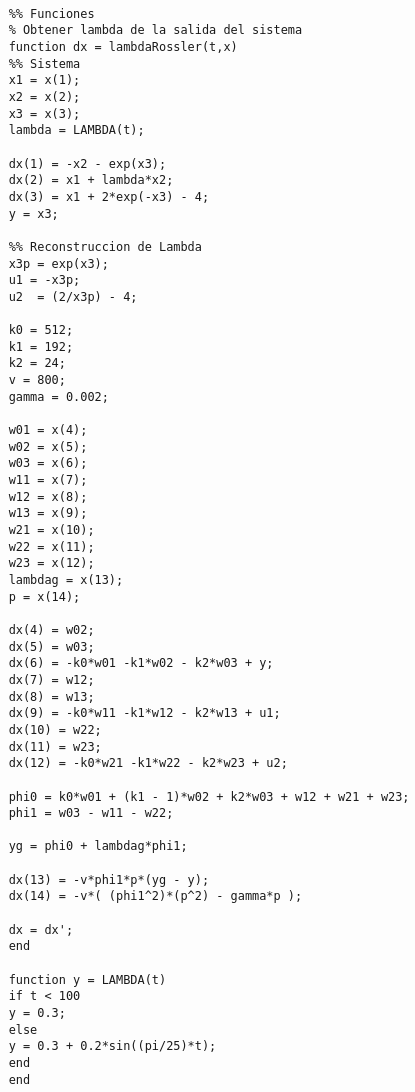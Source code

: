 \begin{verbatim}
	
	%% Funciones
	% Obtener lambda de la salida del sistema
	function dx = lambdaRossler(t,x)
	%% Sistema
	x1 = x(1);
	x2 = x(2);
	x3 = x(3);
	lambda = LAMBDA(t);
	
	dx(1) = -x2 - exp(x3);
	dx(2) = x1 + lambda*x2;
	dx(3) = x1 + 2*exp(-x3) - 4;
	y = x3;
	
	%% Reconstruccion de Lambda
	x3p = exp(x3);
	u1 = -x3p;
	u2  = (2/x3p) - 4;
	
	k0 = 512;
	k1 = 192;
	k2 = 24;
	v = 800;
	gamma = 0.002;
	
	w01 = x(4);
	w02 = x(5);
	w03 = x(6);
	w11 = x(7);
	w12 = x(8);
	w13 = x(9);
	w21 = x(10);
	w22 = x(11);
	w23 = x(12);
	lambdag = x(13);
	p = x(14);
	
	dx(4) = w02;
	dx(5) = w03;
	dx(6) = -k0*w01 -k1*w02 - k2*w03 + y;
	dx(7) = w12;
	dx(8) = w13;
	dx(9) = -k0*w11 -k1*w12 - k2*w13 + u1;
	dx(10) = w22;
	dx(11) = w23;
	dx(12) = -k0*w21 -k1*w22 - k2*w23 + u2;
	
	phi0 = k0*w01 + (k1 - 1)*w02 + k2*w03 + w12 + w21 + w23;
	phi1 = w03 - w11 - w22;
	
	yg = phi0 + lambdag*phi1;
	
	dx(13) = -v*phi1*p*(yg - y);
	dx(14) = -v*( (phi1^2)*(p^2) - gamma*p );
	
	dx = dx';
	end
	
	function y = LAMBDA(t)
	if t < 100
	y = 0.3;
	else
	y = 0.3 + 0.2*sin((pi/25)*t);
	end
	end
	\end{verbatim}
	


